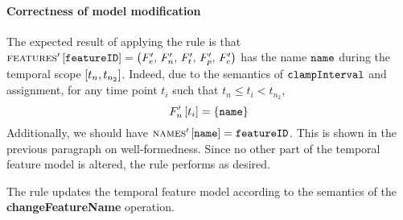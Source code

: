 \paragraph{Correctness of model modification}
The expected result of applying the rule is that $\textsc{features}' \left[ \texttt{featureID} \right] = \left(F'_e,\, F'_n,\, F'_t,\, F'_p,\, F'_c\right)$ has the name $\texttt{name}$ during the temporal scope $\interval{t_n}{t_{n_2}}$. Indeed, due to the semantics of $\texttt{clampInterval}$ and assignment, for any time point $t_i$ such that $t_n \leq t_i < t_{n_2}$,
\[
   F'_n \left[ t_i \right] = \left\{\texttt{name}\right\}
\]
Additionally, we should have $\textsc{names}' \left[ \texttt{name} \right] = \texttt{featureID}$. This is shown in the previous paragraph on well-formedness.
Since no other part of the temporal feature model is altered, the rule performs as desired.
\\

\begin{lemma}
   The  rule updates the temporal feature model according to the semantics of the \textbf{changeFeatureName} operation.
   \label{lemma:change-feature-name-mod}
\end{lemma}
